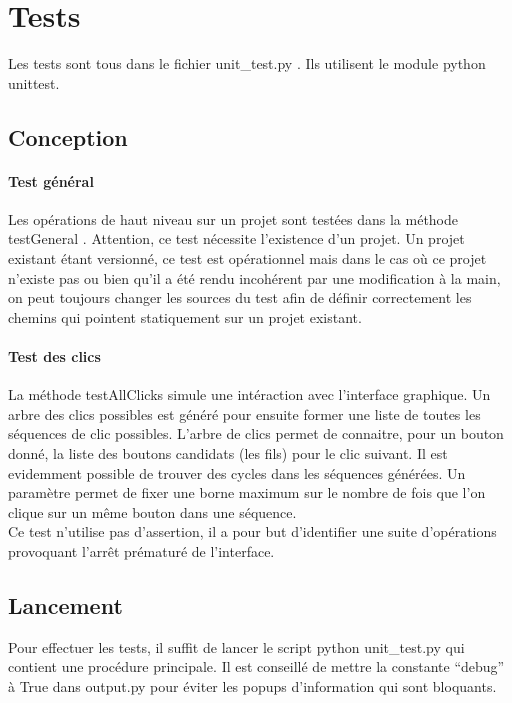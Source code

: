 \documentclass[12pt,a4paper]{article}
\begin{document}
\section{Tests}
    Les tests sont tous dans le fichier unit\_test.py . Ils utilisent le module
    python unittest.
    \subsection{Conception}
    \paragraph{Test général}
    Les opérations de haut niveau sur un projet sont testées dans la méthode
    testGeneral . Attention, ce test nécessite l'existence d'un projet. 
    Un projet existant étant versionné, ce test est opérationnel mais dans le
    cas où ce projet n'existe pas ou bien qu'il a été rendu incohérent par une
    modification à la main, on peut toujours changer les sources du test afin de
    définir correctement les chemins qui pointent statiquement sur un projet
    existant.
    \paragraph{Test des clics}
    La méthode testAllClicks simule une intéraction avec l'interface graphique.
    Un arbre des clics possibles est généré pour ensuite former une liste de
    toutes les séquences de clic possibles. L'arbre de clics permet de
    connaitre, pour un bouton donné, la liste des boutons candidats (les fils)
    pour le clic suivant. Il est evidemment possible de trouver des cycles dans
    les séquences générées. Un paramètre permet de fixer une borne maximum sur
    le nombre de fois que l'on clique sur un même bouton dans une séquence. \\

    Ce test n'utilise pas d'assertion, il a pour but d'identifier une suite
    d'opérations provoquant l'arrêt prématuré de l'interface.

    \subsection{Lancement}
    Pour effectuer les tests, il suffit de lancer le script python unit\_test.py
    qui contient une procédure principale. Il est conseillé de mettre la
    constante ``debug'' à True dans output.py pour éviter les popups
    d'information qui sont bloquants.\\
\end{document}
